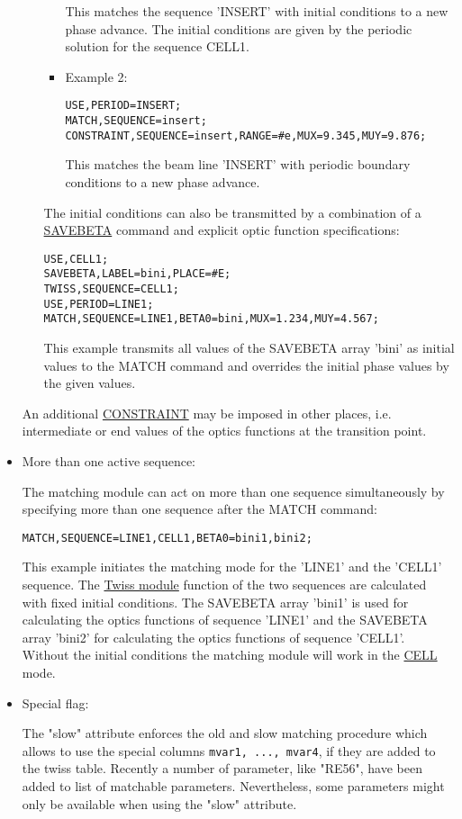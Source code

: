 \begin{itemize}
\begin{itemize}
\begin{itemize}
This matches the sequence 'INSERT' with initial conditions to a new phase advance. The initial conditions are given by the periodic solution for the sequence CELL1.
	
	\item Example 2:
	
\begin{verbatim}
USE,PERIOD=INSERT;
MATCH,SEQUENCE=insert;
CONSTRAINT,SEQUENCE=insert,RANGE=#e,MUX=9.345,MUY=9.876;
\end{verbatim}

This matches the beam line 'INSERT' with periodic boundary conditions to a new phase advance.
\end{itemize}
 
The initial conditions can also be transmitted by a combination of a \href{../control/general.html#savebeta}{SAVEBETA} command and explicit optic function specifications:
 
\begin{verbatim}
USE,CELL1;
SAVEBETA,LABEL=bini,PLACE=#E;
TWISS,SEQUENCE=CELL1;
USE,PERIOD=LINE1;
MATCH,SEQUENCE=LINE1,BETA0=bini,MUX=1.234,MUY=4.567;
\end{verbatim}

This example transmits all values of the SAVEBETA array 'bini' as initial values to the MATCH command and overrides the initial phase values by the given values.
\end{itemize}

An additional \href{match_con.html#constraint}{CONSTRAINT} may be imposed in other places, i.e. intermediate or end values of the optics functions at the transition point. 
 
	\item More than one active sequence:

The matching module can act on more than one sequence simultaneously by specifying more than one sequence after the MATCH command:
 
\begin{verbatim}
MATCH,SEQUENCE=LINE1,CELL1,BETA0=bini1,bini2;
\end{verbatim}

This example initiates the matching mode for the 'LINE1' and the 'CELL1' sequence. The \href{../twiss/twiss.html}{Twiss module} function of the two sequences are calculated with fixed initial conditions. The SAVEBETA array 'bini1' is used for calculating the optics functions of sequence 'LINE1' and the SAVEBETA array 'bini2' for calculating the optics functions of sequence 'CELL1'. Without the initial conditions the matching module will work in the \href{match_main.html#cell}{CELL}
 mode.
 
	\item  Special flag:

 The "slow" attribute enforces the old and slow matching procedure which allows to use the special columns \texttt{mvar1, ..., mvar4}, if they are added to the twiss table. Recently a number of parameter, like "RE56", have been 
 added to list of matchable parameters. Nevertheless, some parameters might only be available when using the "slow" attribute.
 
\end{itemize}
 
